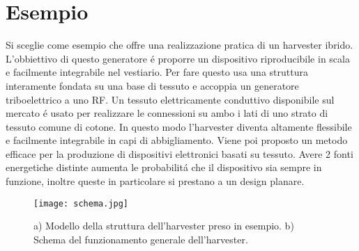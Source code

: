 \chapter{Esempio}
    Si sceglie come esempio \cite{kouWearableAllFabricHybrid2024} che offre una realizzazione pratica di un harvester ibrido. L'obbiettivo di questo generatore \'e proporre un dispositivo riproducibile in scala e facilmente integrabile nel vestiario. Per fare questo usa una struttura interamente fondata su una base di tessuto e accoppia un generatore triboelettrico a uno RF. Un tessuto elettricamente conduttivo disponibile sul mercato \'e usato per realizzare le connessioni su ambo i lati di uno strato di tessuto comune di cotone. In questo modo l'harvester diventa altamente flessibile e facilmente integrabile in capi di abbigliamento. Viene poi proposto un metodo efficace per la produzione di dispositivi elettronici basati su tessuto. Avere 2 fonti energetiche distinte aumenta le probabilit\'a che il dispositivo sia sempre in funzione, inoltre queste in particolare si prestano a un design planare.
    
    \begin{figure}[H]
        \texttt{[image: schema.jpg]}
        \centering
        \caption{a) Modello della struttura dell'harvester preso in esempio. b) Schema del funzionamento generale dell'harvester.\cite{kouWearableAllFabricHybrid2024}}
        \label{fig:schema}
    \end{figure}

